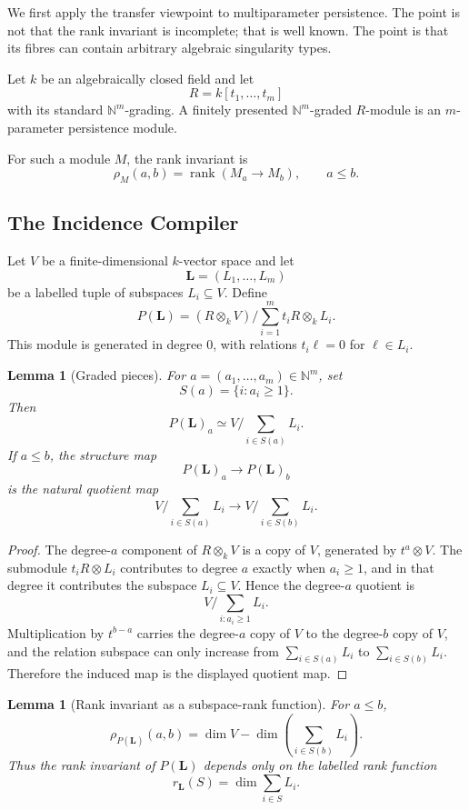 \documentclass[11pt]{article}
\newtheorem{lemma}[theorem]{Lemma}
\DeclareMathOperator{\rank}{rank}
\begin{document}
We first apply the transfer viewpoint to multiparameter persistence. The point is not that the rank invariant is incomplete; that is well known. The point is that its fibres can contain arbitrary algebraic singularity types.

Let \(k\) be an algebraically closed field and let
\[
R=k[t_1,\ldots,t_m]
\]
with its standard \(\mathbb N^m\)-grading. A finitely presented \(\mathbb N^m\)-graded \(R\)-module is an \(m\)-parameter persistence module.

For such a module \(M\), the rank invariant is
\[
\rho_M(a,b)=\rank(M_a\to M_b),
\qquad a\leq b.
\]

\subsection{The Incidence Compiler}

Let \(V\) be a finite-dimensional \(k\)-vector space and let
\[
\mathbf L=(L_1,\ldots,L_m)
\]
be a labelled tuple of subspaces \(L_i\subseteq V\). Define
\[
P(\mathbf L)
=
(R\otimes_k V)\Big/\sum_{i=1}^m t_iR\otimes_k L_i.
\]
This module is generated in degree \(0\), with relations \(t_i\ell=0\) for \(\ell\in L_i\).

\begin{lemma}[Graded pieces]
For \(a=(a_1,\ldots,a_m)\in\mathbb N^m\), set
\[
S(a)=\{i:a_i\geq1\}.
\]
Then
\[
P(\mathbf L)_a
\simeq
V\Big/\sum_{i\in S(a)}L_i.
\]
If \(a\leq b\), the structure map
\[
P(\mathbf L)_a\to P(\mathbf L)_b
\]
is the natural quotient map
\[
V\Big/\sum_{i\in S(a)}L_i
\longrightarrow
V\Big/\sum_{i\in S(b)}L_i.
\]
\end{lemma}

\begin{proof}
The degree-\(a\) component of \(R\otimes_k V\) is a copy of \(V\), generated by \(t^a\otimes V\). The submodule \(t_iR\otimes L_i\) contributes to degree \(a\) exactly when \(a_i\ge1\), and in that degree it contributes the subspace \(L_i\subseteq V\). Hence the degree-\(a\) quotient is
\[
V/\sum_{i:a_i\ge1}L_i.
\]
Multiplication by \(t^{b-a}\) carries the degree-\(a\) copy of \(V\) to the degree-\(b\) copy of \(V\), and the relation subspace can only increase from \(\sum_{i\in S(a)}L_i\) to \(\sum_{i\in S(b)}L_i\). Therefore the induced map is the displayed quotient map.
\end{proof}

\begin{lemma}[Rank invariant as a subspace-rank function]
For \(a\leq b\),
\[
\rho_{P(\mathbf L)}(a,b)
=
\dim V-\dim\left(\sum_{i\in S(b)}L_i\right).
\]
Thus the rank invariant of \(P(\mathbf L)\) depends only on the labelled rank function
\[
r_\mathbf L(S)=\dim\sum_{i\in S}L_i.
\]
\end{lemma}
\end{document}
